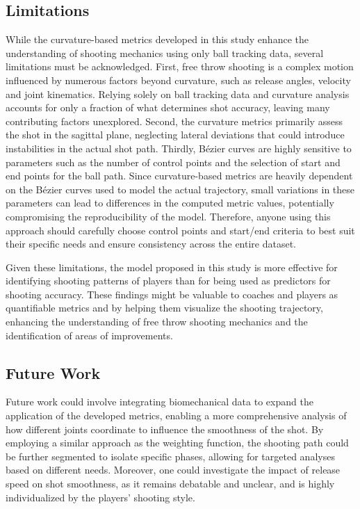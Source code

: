 \documentclass{article}
\begin{document}
    \subsection{Limitations}

      While the curvature-based metrics developed in this study enhance the understanding of shooting mechanics using only ball tracking data, several limitations must be acknowledged. First, free throw shooting is a complex motion influenced by numerous factors beyond curvature, such as release angles, velocity and joint kinematics. Relying solely on ball tracking data and curvature analysis accounts for only a fraction of what determines shot accuracy, leaving many contributing factors unexplored. Second, the curvature metrics primarily assess the shot in the sagittal plane, neglecting lateral deviations that could introduce instabilities in the actual shot path. Thirdly, Bézier curves are highly sensitive to parameters such as the number of control points and the selection of start and end points for the ball path. Since curvature-based metrics are heavily dependent on the Bézier curves used to model the actual trajectory, small variations in these parameters can lead to differences in the computed metric values, potentially compromising the reproducibility of the model. Therefore, anyone using this approach should carefully choose control points and start/end criteria to best suit their specific needs and ensure consistency across the entire dataset.

      Given these limitations, the model proposed in this study is more effective for identifying shooting patterns of players than for being used as predictors for shooting accuracy. These findings might be valuable to coaches and players as quantifiable metrics and by helping them visualize the shooting trajectory, enhancing the understanding of free throw shooting mechanics and the identification of areas of improvements.

    \subsection{Future Work}
    
      Future work could involve integrating biomechanical data to expand the application of the developed metrics, enabling a more comprehensive analysis of how different joints coordinate to influence the smoothness of the shot. By employing a similar approach as the weighting function, the shooting path could be further segmented to isolate specific phases, allowing for targeted analyses based on different needs. Moreover, one could investigate the impact of release speed on shot smoothness, as it remains debatable and unclear, and is highly individualized by the players' shooting style.  

  
\end{document}
